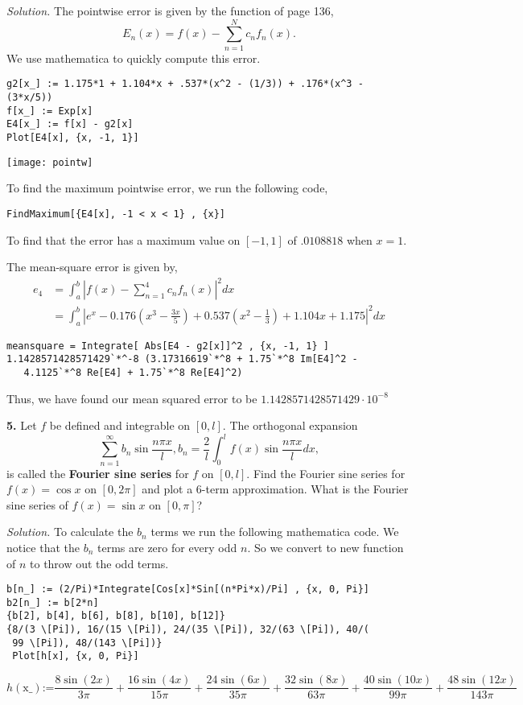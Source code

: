 \documentclass{article}
\begin{document}
\vspace{4mm} 
\textit{Solution.} The pointwise error is given by the function of page 136,
\[
E_n(x) = f(x) - \sum_{n=1}^Nc_nf_n(x).
\]
We use mathematica to quickly compute this error. 
\begin{verbatim}
g2[x_] := 1.175*1 + 1.104*x + .537*(x^2 - (1/3)) + .176*(x^3 - (3*x/5)) 
f[x_] := Exp[x]
E4[x_] := f[x] - g2[x]
Plot[E4[x], {x, -1, 1}]
\end{verbatim}
\texttt{[image: pointw]}

To find the maximum pointwise error, we run the following code,
\begin{verbatim}
FindMaximum[{E4[x], -1 < x < 1} , {x}]
\end{verbatim}
To find that the error has a maximum value on \([-1,1]\) of \(.0108818\) when \(x=1\). 


The mean-square error is given by,
\begin{align*}
e_4 &= \int_a^b |f(x)-\sum_{n=1}^4 c_nf_n(x)|^2 dx \\
&= \int_a^b | e^x - 0.176 \left(x^3-\frac{3 x}{5}\right)+0.537 \left(x^2-\frac{1}{3}\right)+1.104 x+1.175 |^2 dx
\end{align*}
\begin{verbatim}
meansquare = Integrate[ Abs[E4 - g2[x]]^2 , {x, -1, 1} ]
1.1428571428571429`*^-8 (3.17316619`*^8 + 1.75`*^8 Im[E4]^2 - 
   4.1125`*^8 Re[E4] + 1.75`*^8 Re[E4]^2)
\end{verbatim}
Thus, we have found our mean squared error to be  \( 1.1428571428571429 \cdot 10^{-8} \)



\newpage
\textbf{5.} Let \(f\) be defined and integrable on \([0,l]\). The orthogonal expansion \[
\sum_{n=1}^{\infty} b_n \sin\frac{n\pi x}{l}, b_n = \frac{2}{l} \int_0^l f(x) \sin\frac{n\pi x}{l} dx, 
\]
is called the \textbf{Fourier sine series} for \(f\) on \([0,l]\). Find the Fourier sine series for \(f(x)=\cos x \) on \( [0,2\pi]\) and plot  a 6-term approximation. What is the Fourier sine series of \(f(x) = \sin x \) on \( [0,\pi]\)?


\vspace{4mm} 
\textit{Solution.} To calculate the \(b_n\) terms we run the following mathematica code. We notice that the \(b_n\) terms are zero for every odd \(n\). So we convert to new function of \(n\) to throw out the odd terms. 

\begin{verbatim}
b[n_] := (2/Pi)*Integrate[Cos[x]*Sin[(n*Pi*x)/Pi] , {x, 0, Pi}]
b2[n_] := b[2*n]
{b[2], b[4], b[6], b[8], b[10], b[12]}
{8/(3 \[Pi]), 16/(15 \[Pi]), 24/(35 \[Pi]), 32/(63 \[Pi]), 40/(
 99 \[Pi]), 48/(143 \[Pi])}
 Plot[h[x], {x, 0, Pi}]
\end{verbatim}
\[
h(\text{x$\_$})\text{:=}\frac{8 \sin (2 x)}{3 \pi }+\frac{16 \sin (4 x)}{15 \pi }+\frac{24 \sin (6 x)}{35 \pi }+\frac{32 \sin (8 x)}{63 \pi }+\frac{40 \sin (10 x)}{99 \pi }+\frac{48 \sin (12 x)}{143 \pi }\]
\end{document}
